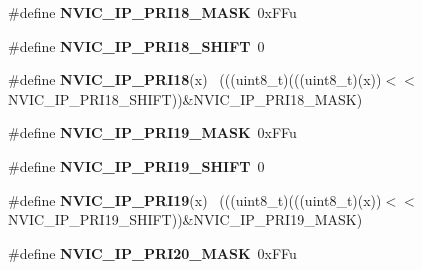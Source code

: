 \begin{DoxyCompactItemize}
\item 
\hypertarget{group___n_v_i_c___register___masks_gacddbeaf8e482e49e9b693221762ceb08}{}\#define {\bfseries N\+V\+I\+C\+\_\+\+I\+P\+\_\+\+P\+R\+I18\+\_\+\+M\+A\+S\+K}~0x\+F\+Fu\label{group___n_v_i_c___register___masks_gacddbeaf8e482e49e9b693221762ceb08}

\item 
\hypertarget{group___n_v_i_c___register___masks_ga5b3a78309e7202f36cb568444614d2a2}{}\#define {\bfseries N\+V\+I\+C\+\_\+\+I\+P\+\_\+\+P\+R\+I18\+\_\+\+S\+H\+I\+F\+T}~0\label{group___n_v_i_c___register___masks_ga5b3a78309e7202f36cb568444614d2a2}

\item 
\hypertarget{group___n_v_i_c___register___masks_gae65b6d9b4863d9af9772794cb942667b}{}\#define {\bfseries N\+V\+I\+C\+\_\+\+I\+P\+\_\+\+P\+R\+I18}(x)                                              ~(((uint8\+\_\+t)(((uint8\+\_\+t)(x))$<$$<$N\+V\+I\+C\+\_\+\+I\+P\+\_\+\+P\+R\+I18\+\_\+\+S\+H\+I\+F\+T))\&N\+V\+I\+C\+\_\+\+I\+P\+\_\+\+P\+R\+I18\+\_\+\+M\+A\+S\+K)\label{group___n_v_i_c___register___masks_gae65b6d9b4863d9af9772794cb942667b}

\item 
\hypertarget{group___n_v_i_c___register___masks_gaeb997ed2960311e45ddb73b596b7603e}{}\#define {\bfseries N\+V\+I\+C\+\_\+\+I\+P\+\_\+\+P\+R\+I19\+\_\+\+M\+A\+S\+K}~0x\+F\+Fu\label{group___n_v_i_c___register___masks_gaeb997ed2960311e45ddb73b596b7603e}

\item 
\hypertarget{group___n_v_i_c___register___masks_gac301695607a1a02a9990d15e34e74c25}{}\#define {\bfseries N\+V\+I\+C\+\_\+\+I\+P\+\_\+\+P\+R\+I19\+\_\+\+S\+H\+I\+F\+T}~0\label{group___n_v_i_c___register___masks_gac301695607a1a02a9990d15e34e74c25}

\item 
\hypertarget{group___n_v_i_c___register___masks_ga5599b4504ee4c1fbb2d042559684442e}{}\#define {\bfseries N\+V\+I\+C\+\_\+\+I\+P\+\_\+\+P\+R\+I19}(x)                                              ~(((uint8\+\_\+t)(((uint8\+\_\+t)(x))$<$$<$N\+V\+I\+C\+\_\+\+I\+P\+\_\+\+P\+R\+I19\+\_\+\+S\+H\+I\+F\+T))\&N\+V\+I\+C\+\_\+\+I\+P\+\_\+\+P\+R\+I19\+\_\+\+M\+A\+S\+K)\label{group___n_v_i_c___register___masks_ga5599b4504ee4c1fbb2d042559684442e}

\item 
\hypertarget{group___n_v_i_c___register___masks_gaa16f6b01e6d9cd95fec227cab319f196}{}\#define {\bfseries N\+V\+I\+C\+\_\+\+I\+P\+\_\+\+P\+R\+I20\+\_\+\+M\+A\+S\+K}~0x\+F\+Fu\label{group___n_v_i_c___register___masks_gaa16f6b01e6d9cd95fec227cab319f196}


\end{DoxyCompactItemize}
